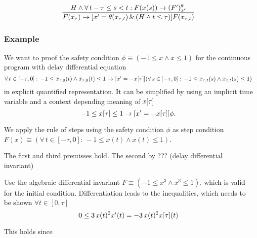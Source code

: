 \documentclass[10pt]{report}
\begin{document}
            \begin{equation}
                \frac{H\wedge\forall\,t-\tau\leq s<t: F(x(s))\rightarrow (F')^{\theta}_{x'}}{F(\bar{x}_{\tau})\rightarrow [x'=\theta(\bar{x}_{\tau,t})\,\&\,(H\wedge t\leq\tau)]F(\bar{x}_{\tau,t})}
            \end{equation}

        \subsubsection{Example}
            \label{sec:example}
            We want to proof the safety condition $\phi\equiv(-1\leq x\wedge x\leq 1)$ for the continuous program with delay differential equation
            \begin{equation}
                \forall\,t\in[-\tau,0]:\,-1\leq\bar{x}_{\tau,0}(t)\wedge\bar{x}_{\tau,0}(t)\leq 1
                \rightarrow
                [x'=-x[\tau]] (\forall\,s\in[-\tau,0]:\,-1\leq\bar{x}_{\tau,t}(s)\wedge\bar{x}_{\tau,t}(s)\leq 1)
            \end{equation}
            in explicit quantified representation. It can be simplified by using an implicit time variable and a context depending meaning of $x[\tau]$
            \begin{equation}
                -1\leq x[\tau]\leq 1 \rightarrow [x'=-x[\tau]]\phi.
            \end{equation}

            We apply the rule of steps using the safety condition $\phi$ as step condition $F(x)\equiv(\forall\,t\in[-\tau,0]:\,-1\leq x(t)\wedge x(t)\leq 1)$.

            The first and third premisses hold. The second by ??? (delay differential invariant)

            Use the algebraic differential invariant $F\equiv(-1\leq x^3\wedge x^3\leq1)$, which is valid for the initial condition. Differentiation leads to the inequalities, which needs to be shown $\forall t\in[0,\tau]$
            \begin{equation}
                0\leq 3\,x(t)^2 x'(t) = -3\,x(t)^2 x[\tau](t)
            \end{equation}

            This holds since



\nocite{*}


\end{document}
